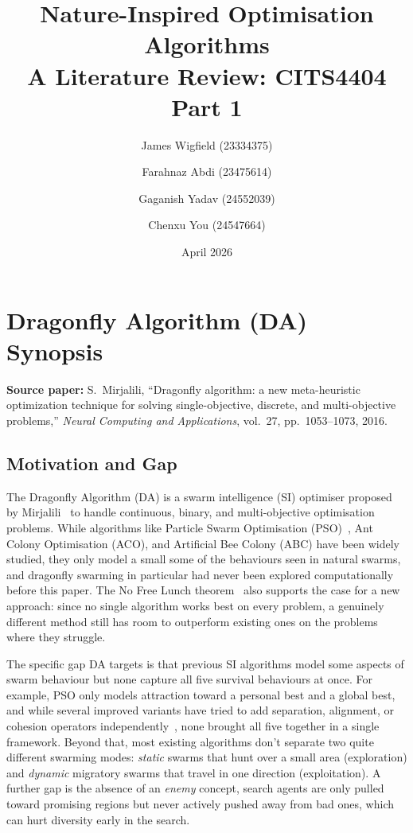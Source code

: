\documentclass[11pt,a4paper]{article}
\title{\textbf{Nature-Inspired Optimisation Algorithms}\\
       \large A Literature Review: CITS4404 Part 1}
\author{James Wigfield (23334375) \and
        Farahnaz Abdi (23475614) \and
        Gaganish Yadav (24552039) \and
        Chenxu You (24547664)}
\date{April 2026}
\begin{document}
\maketitle

\section{Dragonfly Algorithm (DA) Synopsis}

\noindent\textbf{Source paper:} S.\ Mirjalili, ``Dragonfly algorithm: a new
meta-heuristic optimization technique for solving single-objective, discrete,
and multi-objective problems,'' \textit{Neural Computing and Applications},
vol.~27, pp.~1053--1073, 2016.~\cite{mirjalili2016dragonfly} 

\subsection*{Motivation and Gap}

The Dragonfly Algorithm (DA) is a swarm intelligence (SI) optimiser proposed by
Mirjalili~\cite{mirjalili2016dragonfly} to handle continuous, binary, and
multi-objective optimisation problems.
While algorithms like Particle Swarm Optimisation
(PSO)~\cite{kennedy1995pso}, Ant Colony Optimisation (ACO), and Artificial Bee
Colony (ABC) have been widely studied, they only model a small some of the 
behaviours seen in natural swarms, and dragonfly swarming in particular
had never been explored computationally before this paper.
The No Free Lunch theorem~\cite{wolpert1997nfl} also supports the case for a new
approach: since no single algorithm works best on every problem, a genuinely
different method still has room to outperform existing ones on the problems where
they struggle.

The specific gap DA targets is that previous SI algorithms model some aspects of
swarm behaviour but none capture all five survival behaviours at once.
For example, PSO only models attraction toward a personal best and a global
best, and while several improved variants have tried to add separation,
alignment, or cohesion operators
independently~\cite{cui2009boid,kadrovach2002particle,cui2009alignment}, none
brought all five together in a single framework.
Beyond that, most existing algorithms don't separate two quite different swarming
modes: \textit{static} swarms that hunt over a small area (exploration) and
\textit{dynamic} migratory swarms that travel in one direction (exploitation).
A further gap is the absence of an \textit{enemy} concept, search agents are
only pulled toward promising regions but never actively pushed away from bad
ones, which can hurt diversity early in the search.
\end{document}

